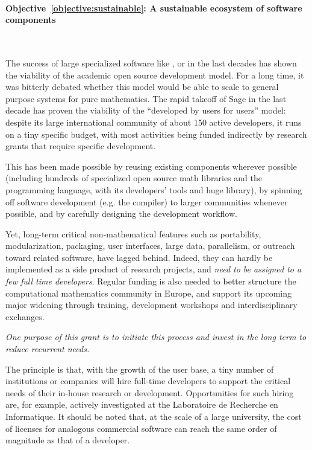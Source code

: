 \documentclass[noworkareas,deliverables,\classoptions]{euproposal}       %
\begin{document}
\begin{proposal}
\paragraph{Objective~\ref{objective:sustainable}: A sustainable
  ecosystem of software components}\ 

The success of large specialized software like \PariGP, \Singular or
\GAP in the last decades has shown the viability of the academic open
source development model. For a long time, it was bitterly
debated whether this model would be able to scale to general
purpose systems for pure mathematics. The rapid takeoff of Sage in the
last decade has proven the viability of the ``developed by users for
users'' model: despite its large international community of about 150
active developers, it runs on a tiny specific budget, with most
activities being funded indirectly by research grants that require
specific development.

This has been made possible by reusing existing components wherever
possible (including hundreds of specialized open source math libraries and
the \Python programming language, with its developers' tools and huge
library), by spinning off software development (e.g. the \Cython
compiler) to larger communities whenever possible, and by carefully
designing the development workflow.

Yet, long-term critical non-mathematical features such as portability,
modularization, packaging, user interfaces, large data, parallelism,
or outreach toward related software, have lagged behind. Indeed,
they can hardly be implemented as a side product of research projects,
and \emph{need to be assigned to a few full time developers}. Regular
funding is also needed to better structure the computational
mathematics community in Europe, and support its upcoming major
widening through training, development workshops and interdisciplinary exchanges.

\emph{One purpose of this grant is to initiate this process and
  invest in the long term to reduce recurrent needs.}

The principle is that, with the growth of the user base, a tiny number
of institutions or companies will hire full-time developers to
support the critical needs of their in-house research or development.
Opportunities for such hiring are, for example, actively investigated at
the Laboratoire de Recherche en Informatique. It should be noted that,
at the scale of a large university, the cost of licenses for analogous
commercial software can reach the same order of magnitude as that of a
developer.


\end{proposal}
\end{document}
